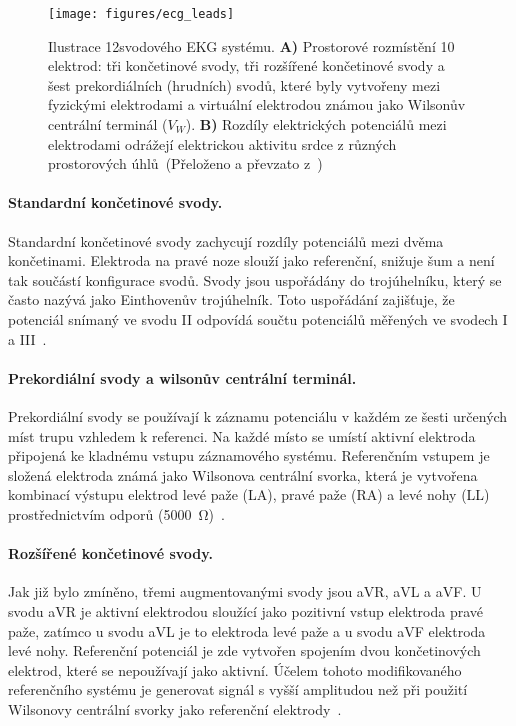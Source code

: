 \begin{figure}[!htb]
    \begin{center}
        \texttt{[image: figures/ecg\_leads]}
        \caption{Ilustrace 12svodového EKG systému. \textbf{A)} Prostorové
            rozmístění 10 elektrod: tři končetinové svody, tři rozšířené končetinové
            svody a šest prekordiálních (hrudních) svodů, které byly vytvořeny mezi
            fyzickými elektrodami a virtuální elektrodou známou jako Wilsonův
            centrální terminál ($V_W$). \textbf{B)} Rozdíly elektrických potenciálů
            mezi elektrodami odrážejí elektrickou aktivitu srdce z různých
            prostorových úhlů~(Přeloženo a převzato z~\cite{Yao2020})}
        \label{fig:ecg_leads}
    \end{center}
\end{figure}

\paragraph{Standardní končetinové svody.}
Standardní končetinové svody zachycují rozdíly potenciálů mezi dvěma
končetinami. Elektroda na pravé noze slouží jako referenční, snižuje šum a není
tak součástí konfigurace svodů. Svody jsou uspořádány do trojúhelníku, který se
často nazývá jako Einthovenův trojúhelník. Toto uspořádání zajišťuje, že
potenciál snímaný ve svodu II odpovídá součtu potenciálů měřených ve svodech I a
III~\cite{Goldberger2017,mirvis2001}.

\paragraph{Prekordiální svody a wilsonův centrální terminál.}
Prekordiální svody se používají k záznamu potenciálu v každém ze šesti určených
míst trupu vzhledem k referenci. Na každé místo se umístí aktivní elektroda
připojená ke kladnému vstupu záznamového systému. Referenčním vstupem je složená
elektroda známá jako Wilsonova centrální svorka, která je vytvořena kombinací
výstupu elektrod levé paže (LA), pravé paže (RA) a levé nohy (LL)
prostřednictvím odporů (5000~\si{\ohm})~\cite{Goldberger2017,mirvis2001}.

\paragraph{Rozšířené končetinové svody.}
Jak již bylo zmíněno, třemi augmentovanými svody jsou aVR, aVL a aVF. U svodu
aVR je aktivní elektrodou sloužící jako pozitivní vstup elektroda pravé paže,
zatímco u svodu aVL je to elektroda levé paže a u svodu aVF elektroda levé nohy.
Referenční potenciál je zde vytvořen spojením dvou končetinových elektrod, které
se nepoužívají jako aktivní. Účelem tohoto modifikovaného referenčního systému
je generovat signál s vyšší amplitudou než při použití Wilsonovy centrální
svorky jako referenční elektrody~\cite{Goldberger2017,mirvis2001}.

